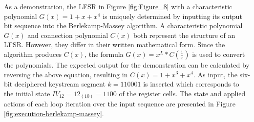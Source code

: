 \clearpage

As a demonstration, the LFSR in Figure \ref{fig:Figure_8} with a characteristic polynomial $G(x) = 1+x+x^4$ is uniquely determined by inputting its output bit sequence into the Berlekamp-Massey algorithm. A characteristic polynomial $G(x)$ and connection polynomial $C(x)$ both represent the structure of an LFSR. However, they differ in their written mathematical form. Since the algorithm produces $C(x)$, the formula $G(x) = x^L * C(\frac{1}{x})$ is used to convert the polynomials. The expected output for the demonstration can be calculated by reversing the above equation, resulting in $C(x) = 1+x^3+x^4$. As input, the six-bit deciphered keystream segment $k=110001$ is inserted which corresponds to the initial state $IV_{12}=12_{(10)}=1100$ of the register cells. The state and applied actions of each loop iteration over the input sequence are presented in Figure \ref{fig:execution-berlekamp-massey}. \\ 


